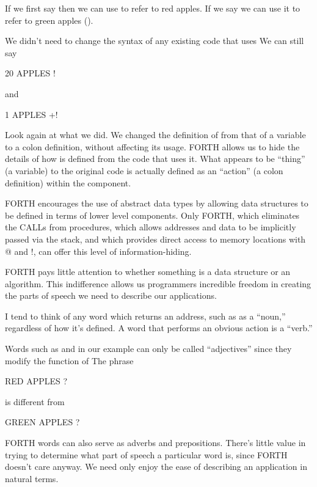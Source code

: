 If we first say  then we can use  to refer
to red apples.  If we say  we can use it to refer to
green apples ().

We didn't need to change the syntax of any existing code that uses
 We can still say

\begin{Code}
20 APPLES !
\end{Code}
and

\begin{Code}
1 APPLES +!
\end{Code}
Look again at what we did. We changed the definition of 
from that of a variable to a colon definition, without affecting its
usage.  FORTH allows us to hide the details of how  is
defined from the code that uses it. What appears to be ``thing'' (a
variable) to the original code is actually defined as an ``action'' (a
colon definition) within the component.

FORTH encourages the use of abstract data types by allowing data
structures to be defined in terms of lower level components. Only
FORTH, which eliminates the CALLs from procedures, which allows
addresses and data to be implicitly passed via the stack, and which
provides direct access to memory locations with @ and !, can offer
this level of information-hiding.

FORTH pays little attention to whether something is a data structure
or an algorithm. This indifference allows us programmers incredible
freedom in creating the parts of speech we need to describe our
applications.

I tend to think of any word which returns an address, such as
 as a ``noun,'' regardless of how it's defined. A word
that performs an obvious action is a ``verb.''

Words such as  and  in our example can only be
called ``adjectives'' since they modify the function of
 The phrase

\begin{Code}
RED APPLES ?
\end{Code}
is different from

\begin{Code}
GREEN APPLES ?
\end{Code}
FORTH words can also serve as adverbs and prepositions. There's little
value in trying to determine what part of speech a particular word is,
since FORTH doesn't care anyway. We need only enjoy the ease of
describing an application in natural terms.


